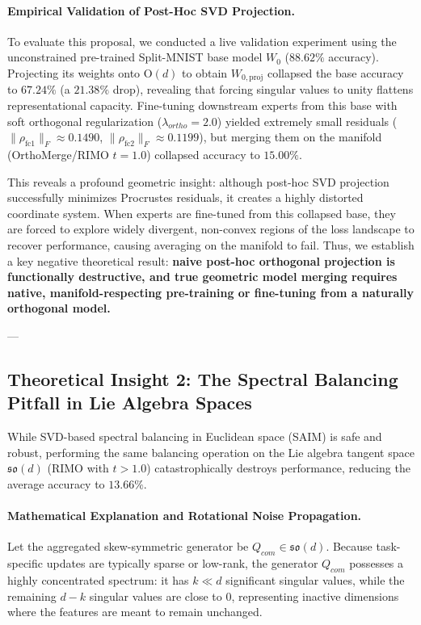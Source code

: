 \paragraph{Empirical Validation of Post-Hoc SVD Projection.}
To evaluate this proposal, we conducted a live validation experiment using the unconstrained pre-trained Split-MNIST base model $W_0$ ($88.62\%$ accuracy). Projecting its weights onto $\mathrm{O}(d)$ to obtain $W_{0,\text{proj}}$ collapsed the base accuracy to $67.24\%$ (a $21.38\%$ drop), revealing that forcing singular values to unity flattens representational capacity. Fine-tuning downstream experts from this base with soft orthogonal regularization ($\lambda_{ortho} = 2.0$) yielded extremely small residuals ($\|\rho_{\text{fc1}}\|_F \approx 0.1490$, $\|\rho_{\text{fc2}}\|_F \approx 0.1199$), but merging them on the manifold (OrthoMerge/RIMO $t=1.0$) collapsed accuracy to $15.00\%$. 

This reveals a profound geometric insight: although post-hoc SVD projection successfully minimizes Procrustes residuals, it creates a highly distorted coordinate system. When experts are fine-tuned from this collapsed base, they are forced to explore widely divergent, non-convex regions of the loss landscape to recover performance, causing averaging on the manifold to fail. Thus, we establish a key negative theoretical result: \textbf{naive post-hoc orthogonal projection is functionally destructive, and true geometric model merging requires native, manifold-respecting pre-training or fine-tuning from a naturally orthogonal model.}

---

\subsection{Theoretical Insight 2: The Spectral Balancing Pitfall in Lie Algebra Spaces}
While SVD-based spectral balancing in Euclidean space (SAIM) is safe and robust, performing the same balancing operation on the Lie algebra tangent space $\mathfrak{so}(d)$ (RIMO with $t > 1.0$) catastrophically destroys performance, reducing the average accuracy to $13.66\%$.

\paragraph{Mathematical Explanation and Rotational Noise Propagation.}
Let the aggregated skew-symmetric generator be $Q_{com} \in \mathfrak{so}(d)$. Because task-specific updates are typically sparse or low-rank, the generator $Q_{com}$ possesses a highly concentrated spectrum: it has $k \ll d$ significant singular values, while the remaining $d-k$ singular values are close to 0, representing inactive dimensions where the features are meant to remain unchanged.

